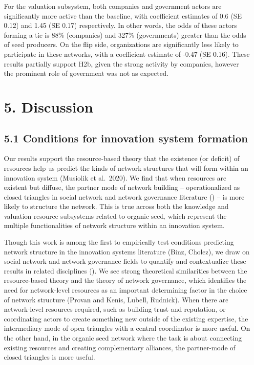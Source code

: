 \documentclass[twoside,12pt,final]{ucthesis-CA2012}
\begin{document}
\begin{ucmainmatter}
For the valuation subsystem, both companies and government actors are
significantly more active than the baseline, with coefficient estimates
of 0.6 (SE 0.12) and 1.45 (SE 0.17) respectively. In other words, the
odds of these actors forming a tie is 88\% (companies) and 327\%
(governments) greater than the odds of seed producers. On the flip side,
organizations are significantly less likely to participate in these
networks, with a coefficient estimate of -0.47 (SE 0.16). These results
partially support H2b, given the strong activity by companies, however
the prominent role of government was not as expected.

\hypertarget{discussion}{%
\section{5. Discussion}\label{discussion}}

\hypertarget{conditions-for-innovation-system-formation}{%
\subsection{5.1 Conditions for innovation system formation}\label{conditions-for-innovation-system-formation}}

Our results support the resource-based theory that the existence (or
deficit) of resources help us predict the kinds of network structures
that will form within an innovation system (Musiolik et al.~2020). We
find that when resources are existent but diffuse, the partner mode of
network building -- operationalized as closed triangles in social
network and network governance literature () -- is more likely to
structure the network. This is true across both the knowledge and
valuation resource subsystems related to organic seed, which represent
the multiple functionalities of network structure within an innovation
system.

Though this work is among the first to empirically test conditions
predicting network structure in the innovation systems literature (Binz,
Cholez), we draw on social network and network governance fields to
quantify and contextualize these results in related disciplines (). We
see strong theoretical similarities between the resource-based theory
and the theory of network governance, which identifies the need for
network-level resources as an important determining factor in the choice
of network structure (Provan and Kenis, Lubell, Rudnick). When there are
network-level resources required, such as building trust and reputation,
or coordinating actors to create something new outside of the existing
expertise, the intermediary mode of open triangles with a central
coordinator is more useful. On the other hand, in the organic seed
network where the task is about connecting existing resources and
creating complementary alliances, the partner-mode of closed triangles
is more useful.


\end{ucmainmatter}
\end{document}
